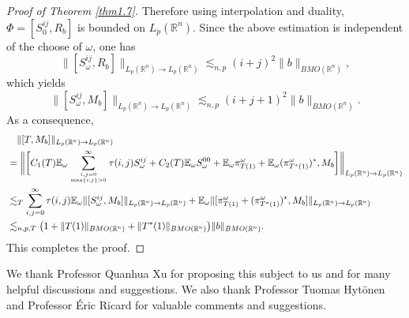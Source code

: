 \documentclass[oneside,english,a4wide]{amsart}
\numberwithin{equation}{section}
\numberwithin{figure}{section}
\theoremstyle{plain}
\theoremstyle{plain}
\theoremstyle{definition}
\theoremstyle{plain}
\theoremstyle{remark}
\theoremstyle{definition}
\theoremstyle{remark}
\theoremstyle{definition}
\newcommand{\8}{\infty}
\begin{document}
\begin{proof}[Proof of Theorem \ref{thm1.7}]
Therefore using interpolation and duality, $\varPhi=[S^{ij}_0,R_b]$ is bounded on $L_p(\mathbb{R}^n)$. Since the above estimation is independent of the choose of $\omega$, one has
$$ \|[S_\omega^{ij}, R_b]\|_{L_p(\mathbb{R}^n)\to L_p(\mathbb{R}^n)}\lesssim_{n,p} (i+j)^2\|b\|_{BMO(\mathbb{R}^n)}, $$
which yields
$$ \|[S_\omega^{ij}, M_b]\|_{L_p(\mathbb{R}^n)\to L_p(\mathbb{R}^n)}\lesssim_{n,p}  (i+j+1)^2\|b\|_{BMO(\mathbb{R}^n)}. $$
As a consequence, 
\begin{equation*}
	\begin{aligned}
		{}&\quad\|[T,M_b]\|_{L_p(\mathbb{R}^n)\to L_p(\mathbb{R}^n)}\\&=\biggl\|\biggl[C_1(T)\mathbb{E}_\omega\sum_{i,j=0\atop \max\{i,j\}>0}^\infty \tau(i, j)S_\omega^{ij}+C_2(T)\mathbb{E}_\omega S_\omega^{00}+\mathbb{E}_\omega \pi^\omega_{T(1)}+\mathbb{E}_\omega (\pi^\omega_{T^*(1)})^*,M_b\biggr]\biggr\|_{L_p(\mathbb{R}^n)\to L_p(\mathbb{R}^n)}\\
		&\lesssim_T \sum_{i,j=0}^\infty \tau(i, j)\mathbb{E}_\omega\|[S_\omega^{ij},M_b]\|_{L_p(\mathbb{R}^n)\to L_p(\mathbb{R}^n)}+\mathbb{E}_\omega\|[ \pi^\omega_{T(1)}+ (\pi^\omega_{T^*(1)})^*,M_b]\|_{L_p(\mathbb{R}^n)\to L_p(\mathbb{R}^n)}\\
		&\lesssim_{n,p, T} \big(1+\|T(1)\|_{BMO(\mathbb{R}^n)}+\|T^*(1)\|_{BMO(\mathbb{R}^n)}\big)\|b\|_{BMO(\mathbb{R}^n)}.
	\end{aligned}
\end{equation*}
This completes the proof.
\end{proof}	

 We thank Professor Quanhua Xu for proposing this subject to us and for many helpful discussions and suggestions. We also thank Professor Tuomas Hyt\"{o}nen and Professor \'{E}ric Ricard for valuable comments and suggestions.



\end{document}

